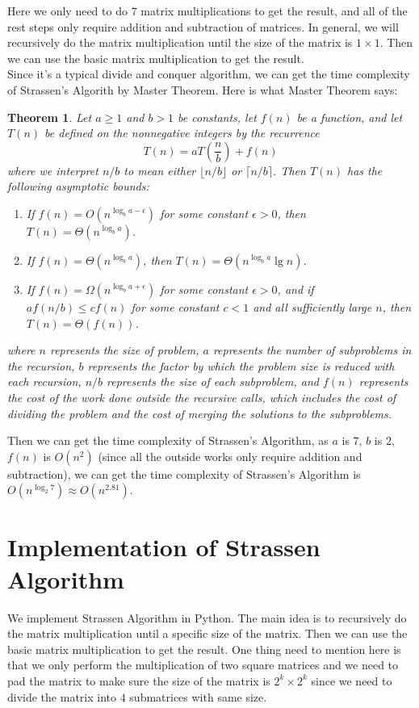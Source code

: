 \documentclass{article}
\newtheorem{theorem}{Theorem}
\begin{document}
Here we only need to do $7$ matrix multiplications to get the result, and all of the rest steps only require addition and subtraction of matrices.
In general, we will recursively do the matrix multiplication until the size of the matrix is $1 \times 1$. Then we can use the basic matrix 
multiplication to get the result.\\
Since it's a typical divide and conquer algorithm, we can get the time complexity of Strassen's Algorith by Master Theorem. Here is what Master Theorem says:
\begin{theorem}
    Let $a \geq 1$ and $b > 1$ be constants, let $f(n)$ be a function, and let $T(n)$ be defined on the nonnegative integers by the recurrence
    \begin{equation}
        T(n) = aT(\frac{n}{b}) + f(n)
    \end{equation}
    where we interpret $n/b$ to mean either $\lfloor n/b \rfloor$ or $\lceil n/b \rceil$. Then $T(n)$ has the following asymptotic bounds:
    \begin{enumerate}
        \item If $f(n) = O(n^{\log_b a - \epsilon})$ for some constant $\epsilon > 0$, then $T(n) = \Theta(n^{\log_b a})$.
        \item If $f(n) = \Theta(n^{\log_b a})$, then $T(n) = \Theta(n^{\log_b a} \lg n)$.
        \item If $f(n) = \Omega(n^{\log_b a + \epsilon})$ for some constant $\epsilon > 0$, and if $af(n/b) \leq cf(n)$ for some constant $c < 1$ and all sufficiently large $n$, then $T(n) = \Theta(f(n))$.
    \end{enumerate}
    where $n$ represents the size of problem, $a$ represents the number of subproblems in the recursion, $b$ represents the factor by which the problem size is reduced with each recursion, $n/b$ represents 
    the size of each subproblem, and $f(n)$ represents the cost of the work done outside the recursive calls, which includes the cost of dividing the problem and the cost of merging the solutions to the subproblems.
\end{theorem}

Then we can get the time complexity of Strassen's Algorithm, as $a$ is $7$, $b$ is $2$, $f(n)$ is $O(n^2)$ (since all the outside works only require addition and subtraction), we can get the 
time complexity of Strassen's Algorithm is $O(n^{\log_2 7}) \approx O(n^{2.81})$.

\section{Implementation of Strassen Algorithm}
\hspace{5.5mm}We implement Strassen Algorithm in Python. The main idea is to recursively do the matrix multiplication until a specific size of the matrix. Then we can use the basic matrix multiplication to 
get the result. One thing need to mention here is that we only perform the multiplication of two square matrices and we need to pad the matrix to make sure the size of the matrix is $2^k \times 2^k$ since we need to 
divide the matrix into $4$ submatrices with same size.\\
\end{document}
